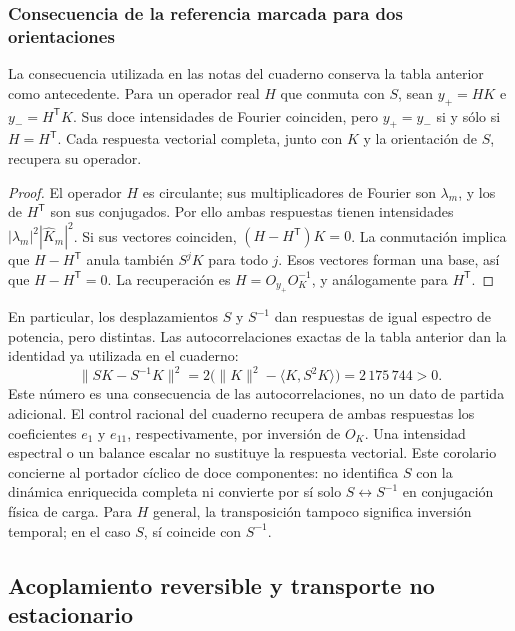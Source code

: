 \subsubsection{Consecuencia de la referencia marcada para dos orientaciones}
\label{md:antmem:orientaciones}
La consecuencia utilizada en las notas del cuaderno conserva la tabla
anterior como antecedente. Para un operador real \(H\) que conmuta con
\(S\), sean \(y_+=HK\) e \(y_-=H^{\mathsf T}K\).
Sus doce intensidades de Fourier coinciden, pero \(y_+=y_-\) si y sólo
si \(H=H^{\mathsf T}\). Cada respuesta vectorial completa, junto con
\(K\) y la orientación de \(S\), recupera su operador.
\begin{proof}
El operador \(H\) es circulante; sus multiplicadores de Fourier son
\(\lambda_m\), y los de \(H^{\mathsf T}\) son sus conjugados.
Por ello ambas respuestas tienen intensidades
\(|\lambda_m|^2|\widehat K_m|^2\).
Si sus vectores coinciden, \((H-H^{\mathsf T})K=0\).
La conmutación implica que \(H-H^{\mathsf T}\) anula también \(S^jK\)
para todo \(j\). Esos vectores forman una base, así que
\(H-H^{\mathsf T}=0\). La recuperación es
\(H=O_{y_+}O_K^{-1}\), y análogamente para \(H^{\mathsf T}\).
\end{proof}
En particular, los desplazamientos \(S\) y \(S^{-1}\) dan respuestas
de igual espectro de potencia, pero distintas. Las autocorrelaciones
exactas de la tabla anterior dan la identidad ya utilizada en el cuaderno:
\begin{equation}
 \|SK-S^{-1}K\|^2
 =2\bigl(\|K\|^2-\langle K,S^2K\rangle\bigr)
 =2\,175\,744>0.
 \label{md:antmem:distancia-orientada}
\end{equation}
Este número es una consecuencia de las autocorrelaciones, no un dato
de partida adicional. El control racional del cuaderno recupera de ambas
respuestas los coeficientes \(e_1\) y \(e_{11}\), respectivamente, por
inversión de \(O_K\). Una intensidad espectral o un balance escalar no
sustituye la respuesta vectorial.
Este corolario concierne al portador cíclico de doce componentes:
no identifica \(S\) con la dinámica enriquecida completa ni convierte
por sí solo \(S\leftrightarrow S^{-1}\) en conjugación física de carga.
Para \(H\) general, la transposición tampoco significa inversión temporal;
en el caso \(S\), sí coincide con \(S^{-1}\).

\subsection{Acoplamiento reversible y transporte no estacionario}
\label{md:antmem:acoplamiento}
